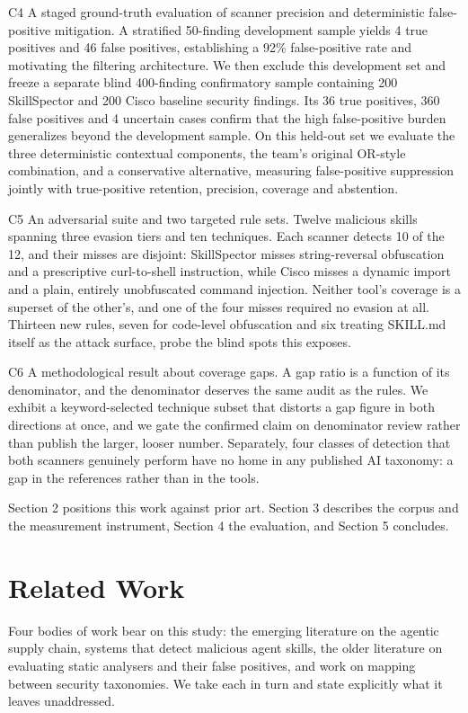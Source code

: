 \documentclass[conference]{IEEEtran}
\begin{document}
C4  A staged ground-truth evaluation of scanner precision and deterministic false-positive mitigation. A stratified 50-finding development sample yields 4 true positives and 46 false positives, establishing a 92\% false-positive rate and motivating the filtering architecture. We then exclude this development set and freeze a separate blind 400-finding confirmatory sample containing 200 SkillSpector and 200 Cisco baseline security findings. Its 36 true positives, 360 false positives and 4 uncertain cases confirm that the high false-positive burden generalizes beyond the development sample. On this held-out set we evaluate the three deterministic contextual components, the team's original OR-style combination, and a conservative alternative, measuring false-positive suppression jointly with true-positive retention, precision, coverage and abstention.

C5  An adversarial suite and two targeted rule sets.  Twelve malicious skills spanning three evasion tiers and ten techniques. Each scanner detects 10 of the 12, and their misses are disjoint: SkillSpector misses string-reversal obfuscation and a prescriptive curl-to-shell instruction, while Cisco misses a dynamic import and a plain, entirely unobfuscated command injection. Neither tool's coverage is a superset of the other's, and one of the four misses required no evasion at all. Thirteen new rules, seven for code-level obfuscation and six treating SKILL.md itself as the attack surface, probe the blind spots this exposes.

C6  A methodological result about coverage gaps.  A gap ratio is a function of its denominator, and the denominator deserves the same audit as the rules. We exhibit a keyword-selected technique subset that distorts a gap figure in both directions at once, and we gate the confirmed claim on denominator review rather than publish the larger, looser number. Separately, four classes of detection that both scanners genuinely perform have no home in any published AI taxonomy: a gap in the references rather than in the tools.

Section 2 positions this work against prior art. Section 3 describes the corpus and the measurement instrument, Section 4 the evaluation, and Section 5 concludes.

\section{Related Work}

Four bodies of work bear on this study: the emerging literature on the agentic supply chain, systems that detect malicious agent skills, the older literature on evaluating static analysers and their false positives, and work on mapping between security taxonomies. We take each in turn and state explicitly what it leaves unaddressed.
\end{document}
